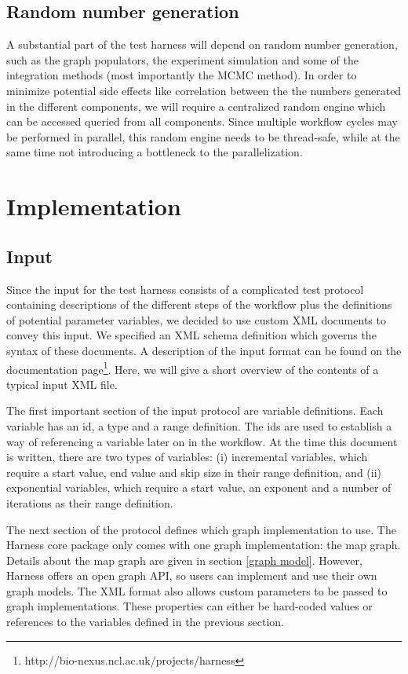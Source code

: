 \documentclass{scrartcl}
\begin{document}
\subsection{Random number generation}

A substantial part of the test harness will depend on random number generation, such as the graph populators, the experiment simulation and some of the integration methods (most importantly the MCMC method). In order to minimize potential side effects like correlation between the the numbers generated in the different components, we will require a centralized random engine which can be accessed queried from all components. Since multiple workflow cycles may be performed in parallel, this random engine needs to be thread-safe, while at the same time not introducing a bottleneck to the parallelization. 

\section{Implementation}

\subsection{Input}

Since the input for the test harness consists of a complicated test protocol containing descriptions of the different steps of the workflow plus the definitions of potential parameter variables, we decided to use custom XML documents to convey this input. We specified an XML schema definition which governs the syntax of these documents. A description of the input format can be found on the documentation page\footnote{http://bio-nexus.ncl.ac.uk/projects/harness}. Here, we will give a short overview of the contents of a typical input XML file.%

The first important section of the input protocol are variable definitions. Each variable has an id, a type and a range definition. The ids are used to establish a way of referencing a variable later on in the workflow. At the time this document is written, there are two types of variables: (i) incremental variables, which require a start value, end value and skip size in their range definition, and (ii) exponential variables, which require a start value, an exponent and a number of iterations as their range definition.

The next section of the protocol defines which graph implementation to use. The Harness core package only comes with one graph implementation: the map graph. Details about the map graph are given in section \ref{graph model}. However, Harness offers an open graph API, so users can implement and use their own graph models. The XML format also allows custom parameters to be passed to graph implementations. These properties can either be hard-coded values or references to the variables defined in the previous section.
\end{document}
